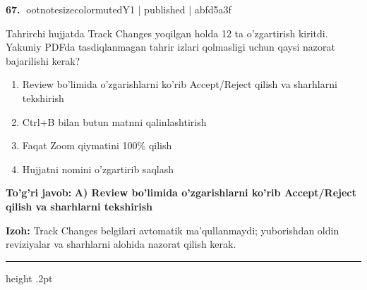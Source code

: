 \documentclass[10pt,a4paper]{article}
\begin{document}
\textbf{\color{ink}67.} {ootnotesizecolor{muted}Y1 | published | abfd5a3f}
\par
Tahrirchi hujjatda Track Changes yoqilgan holda 12 ta o'zgartirish kiritdi. Yakuniy PDFda tasdiqlanmagan tahrir izlari qolmasligi uchun qaysi nazorat bajarilishi kerak?
\begin{enumerate}[label=\Alph*),leftmargin=9mm]
\item Review bo'limida o'zgarishlarni ko'rib Accept/Reject qilish va sharhlarni tekshirish
\item Ctrl+B bilan butun matnni qalinlashtirish
\item Faqat Zoom qiymatini 100\% qilish
\item Hujjatni nomini o'zgartirib saqlash
\end{enumerate}
\begin{tcolorbox}[enhanced,breakable,colback=teal!4,colframe=teal!55!black,boxrule=0.45pt,arc=1.2mm,left=2.8mm,right=2.8mm,top=2mm,bottom=2mm]
\textbf{\color{teal}To'g'ri javob:} \textbf{A) Review bo'limida o'zgarishlarni ko'rib Accept/Reject qilish va sharhlarni tekshirish}
\par\smallskip
\textbf{Izoh:} Track Changes belgilari avtomatik ma'qullanmaydi; yuborishdan oldin reviziyalar va sharhlarni alohida nazorat qilish kerak.
\end{tcolorbox}
\vspace{2mm}\hrule height .2pt\vspace{2mm}
\end{document}
